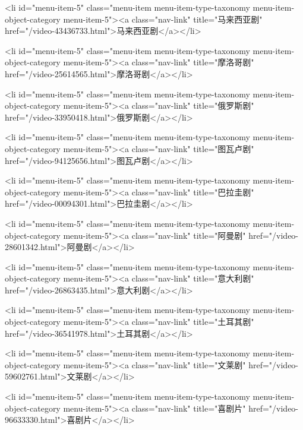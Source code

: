                             <li id="menu-item-5" class="menu-item menu-item-type-taxonomy menu-item-object-category menu-item-5"><a class="nav-link" title="马来西亚剧" href="/video-43436733.html">马来西亚剧</a></li>
                            
                            <li id="menu-item-5" class="menu-item menu-item-type-taxonomy menu-item-object-category menu-item-5"><a class="nav-link" title="摩洛哥剧" href="/video-25614565.html">摩洛哥剧</a></li>
                            
                            <li id="menu-item-5" class="menu-item menu-item-type-taxonomy menu-item-object-category menu-item-5"><a class="nav-link" title="俄罗斯剧" href="/video-33950418.html">俄罗斯剧</a></li>
                            
                            <li id="menu-item-5" class="menu-item menu-item-type-taxonomy menu-item-object-category menu-item-5"><a class="nav-link" title="图瓦卢剧" href="/video-94125656.html">图瓦卢剧</a></li>
                            
                            <li id="menu-item-5" class="menu-item menu-item-type-taxonomy menu-item-object-category menu-item-5"><a class="nav-link" title="巴拉圭剧" href="/video-00094301.html">巴拉圭剧</a></li>
                            
                            <li id="menu-item-5" class="menu-item menu-item-type-taxonomy menu-item-object-category menu-item-5"><a class="nav-link" title="阿曼剧" href="/video-28601342.html">阿曼剧</a></li>
                            
                            <li id="menu-item-5" class="menu-item menu-item-type-taxonomy menu-item-object-category menu-item-5"><a class="nav-link" title="意大利剧" href="/video-26863435.html">意大利剧</a></li>
                            
                            <li id="menu-item-5" class="menu-item menu-item-type-taxonomy menu-item-object-category menu-item-5"><a class="nav-link" title="土耳其剧" href="/video-36541978.html">土耳其剧</a></li>
                            
                            <li id="menu-item-5" class="menu-item menu-item-type-taxonomy menu-item-object-category menu-item-5"><a class="nav-link" title="文莱剧" href="/video-59602761.html">文莱剧</a></li>
                            
                            <li id="menu-item-5" class="menu-item menu-item-type-taxonomy menu-item-object-category menu-item-5"><a class="nav-link" title="喜剧片" href="/video-96633330.html">喜剧片</a></li>
                            
